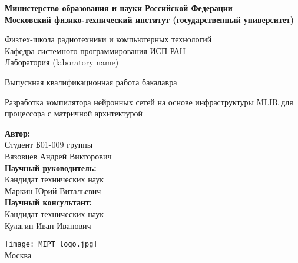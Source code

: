 \begin{center}
    \large\textbf{Министерство образования и науки Российской Федерации \\
    Московский физико-технический институт (государственный
    университет)} \\
    \vspace{1cm}

    Физтех-школа радиотехники и компьютерных технологий \\

    Кафедра системного программирования ИСП РАН \\
    Лаборатория (laboratory name)\\

    \vspace{3em}

    Выпускная квалификационная работа бакалавра
\end{center}

\begin{center}
    \vspace{\fill}
    \LARGE{Разработка компилятора нейронных сетей на основе инфраструктуры MLIR для процессора с матричной архитектурой}

    \vspace{\fill}
\end{center}


\begin{flushright}
    \textbf{Автор:} \\
    Студент Б01-009 группы \\
    Вязовцев Андрей Викторович \\
    \vspace{2em}
    \textbf{Научный руководитель:} \\
    Кандидат технических наук \\
    Маркин Юрий Витальевич \\
    \vspace{2em}
    \textbf{Научный консультант:} \\
    Кандидат технических наук \\
    Кулагин Иван Иванович \\
\end{flushright}

\vspace{7em}

\begin{center}
    \texttt{[image: MIPT\_logo.jpg]}\\
    Москва \the\year{}
\end{center}

\thispagestyle{empty}

\newpage
\setcounter{page}{2}
\fancyfoot[c]{\thepage}
\fancyhead[R]{}